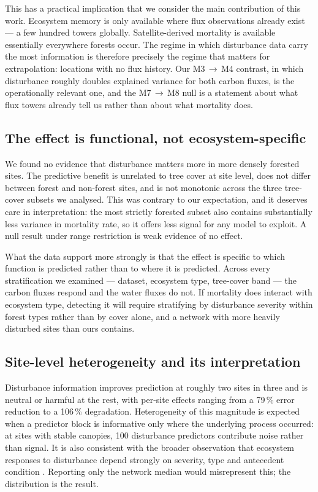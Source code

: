 \documentclass[pdflatex,sn-nature]{sn-jnl}%
\theoremstyle{thmstyleone}%
\theoremstyle{thmstyletwo}%
\theoremstyle{thmstylethree}%
\begin{document}
This has a practical implication that we consider the main contribution of this work. Ecosystem memory is only available where flux observations already exist --- a few hundred towers globally. Satellite-derived mortality is available essentially everywhere forests occur. The regime in which disturbance data carry the most information is therefore precisely the regime that matters for extrapolation: locations with no flux history. Our M3\,$\rightarrow$\,M4 contrast, in which disturbance roughly doubles explained variance for both carbon fluxes, is the operationally relevant one, and the M7\,$\rightarrow$\,M8 null is a statement about what flux towers already tell us rather than about what mortality does.

\subsection{The effect is functional, not ecosystem-specific}

We found no evidence that disturbance matters more in more densely forested sites. The predictive benefit is unrelated to tree cover at site level, does not differ between forest and non-forest sites, and is not monotonic across the three tree-cover subsets we analysed. This was contrary to our expectation, and it deserves care in interpretation: the most strictly forested subset also contains substantially less variance in mortality rate, so it offers less signal for any model to exploit. A null result under range restriction is weak evidence of no effect.

What the data support more strongly is that the effect is specific to which function is predicted rather than to where it is predicted. Across every stratification we examined --- dataset, ecosystem type, tree-cover band --- the carbon fluxes respond and the water fluxes do not. If mortality does interact with ecosystem type, detecting it will require stratifying by disturbance severity within forest types rather than by cover alone, and a network with more heavily disturbed sites than ours contains.

\subsection{Site-level heterogeneity and its interpretation}

Disturbance information improves prediction at roughly two sites in three and is neutral or harmful at the rest, with per-site effects ranging from a 79\,\% error reduction to a 106\,\% degradation. Heterogeneity of this magnitude is expected when a predictor block is informative only where the underlying process occurred: at sites with stable canopies, 100 disturbance predictors contribute noise rather than signal. It is also consistent with the broader observation that ecosystem responses to disturbance depend strongly on severity, type and antecedent condition \cite{gough_disturbance_2024,flower2015responses}. Reporting only the network median would misrepresent this; the distribution is the result.
\end{document}
